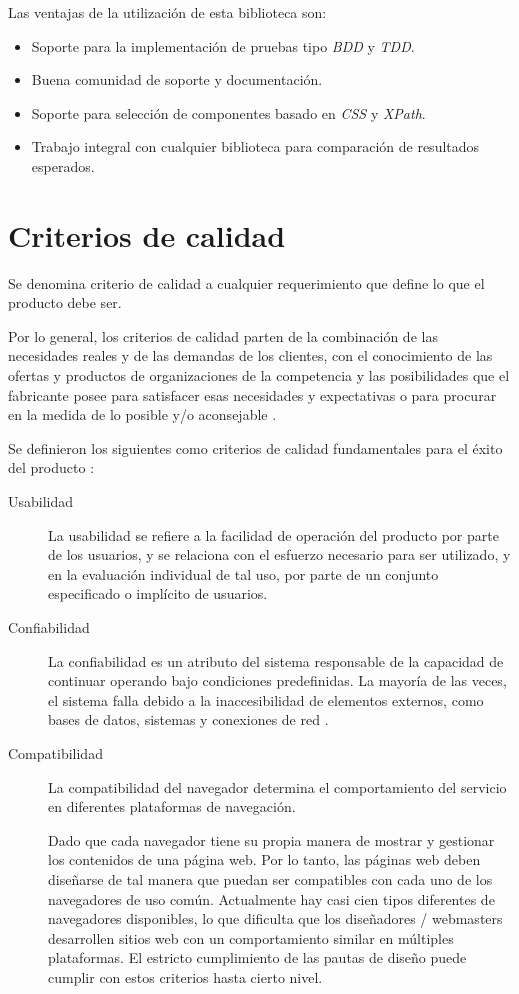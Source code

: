 Las ventajas de la utilización de esta biblioteca son:

\begin{itemize}
    \item Soporte para la implementación de pruebas tipo \emph{BDD} y
        \emph{TDD}.
    \item Buena comunidad de soporte y documentación.
    \item Soporte para selección de componentes basado en \emph{CSS} y
        \emph{XPath}.
    \item Trabajo integral  con cualquier biblioteca para comparación de
        resultados esperados.
\end{itemize}

\section{Criterios de calidad}
Se denomina criterio de calidad a cualquier requerimiento que define lo que el
producto debe ser.

Por lo general, los criterios de calidad parten de la combinación de las
necesidades reales y de las demandas de los clientes, con el conocimiento de las
ofertas y productos de organizaciones de la competencia y las posibilidades que
el fabricante posee para satisfacer esas necesidades y expectativas o para
procurar en la medida de lo posible y/o aconsejable \parencite{Haaz}.

Se definieron los siguientes como criterios de calidad fundamentales para el
éxito del producto \parencite{Fillottrani}:

\begin{description}
\item [Usabilidad] La usabilidad se refiere a la facilidad de operación del
producto por parte de los usuarios, y se relaciona con el esfuerzo
necesario para ser utilizado, y en la evaluación individual de tal uso, por
parte de un conjunto especificado o implícito de usuarios.

\item [Confiabilidad] La confiabilidad es un atributo del sistema responsable de
la capacidad de continuar operando bajo condiciones predefinidas. La mayoría de
las veces, el sistema falla debido a la inaccesibilidad de elementos externos,
como bases de datos, sistemas y conexiones de red \parencite{Ashanin}.

\item [Compatibilidad] La compatibilidad del navegador determina el
comportamiento del servicio en diferentes plataformas de navegación.

Dado que cada navegador tiene su propia manera de mostrar y gestionar los
contenidos de una página web. Por lo tanto, las páginas web deben diseñarse
de tal manera que puedan ser compatibles con cada uno de los navegadores de uso
común. Actualmente hay casi cien tipos diferentes de navegadores disponibles, lo
que dificulta que los diseñadores / webmasters desarrollen sitios web con un
comportamiento similar en múltiples plataformas. El estricto cumplimiento de las
pautas de diseño puede cumplir con estos criterios hasta cierto nivel.
\end{description}

